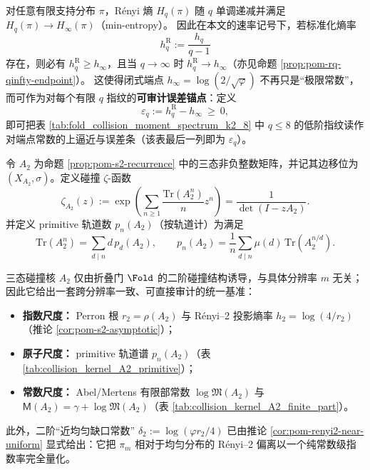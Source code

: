 \begin{remark}\label{rem:pom-renyi-gap-to-hinfty}
对任意有限支持分布 \(\pi\)，Rényi 熵 \(H_q(\pi)\) 随 \(q\) 单调递减并满足 \(H_q(\pi)\to H_\infty(\pi)\)（min-entropy）。
因此在本文的速率记号下，若标准化熵率
\[
h_q^{\mathrm R}:=\frac{h_q}{q-1}
\]
存在，则必有 \(h_q^{\mathrm R}\ge h_\infty\)，且当 \(q\to\infty\) 时 \(h_q^{\mathrm R}\to h_\infty\)（亦见命题 \ref{prop:pom-rq-qinfty-endpoint}）。
这使得闭式端点 \(h_\infty=\log(2/\sqrt{\varphi})\) 不再只是“极限常数”，而可作为对每个有限 \(q\) 指纹的\textbf{可审计误差锚点}：定义
\[
\varepsilon_q:=h_q^{\mathrm R}-h_\infty\ \ge\ 0,
\]
即可把表 \ref{tab:fold_collision_moment_spectrum_k2_8} 中 \(q\le 8\) 的低阶指纹读作对端点常数的上逼近与误差条（该表最后一列即为 \(\varepsilon_q\)）。
\end{remark}

\begin{definition}\label{def:pom-collision-zeta}
令 \(A_2\) 为命题 \ref{prop:pom-s2-recurrence} 中的三态非负整数矩阵，并记其边移位为 \((X_{A_2},\sigma)\)。定义碰撞 \(\zeta\)-函数
$$
\zeta_{A_2}(z):=\exp\!\left(\sum_{n\ge 1}\frac{\mathrm{Tr}(A_2^n)}{n}z^n\right)
=\frac{1}{\det(I-zA_2)}.
$$
并定义 primitive 轨道数 \(p_n(A_2)\)（按轨道计）为满足
$$
\mathrm{Tr}(A_2^n)=\sum_{d\mid n} d\,p_d(A_2),
\qquad
p_n(A_2)=\frac{1}{n}\sum_{d\mid n}\mu(d)\,\mathrm{Tr}(A_2^{n/d}).
$$
\end{definition}




\begin{corollary}\label{cor:pom-a2-benchmark}
三态碰撞核 \(A_2\) 仅由折叠门 \(\Fold\) 的二阶碰撞结构诱导，与具体分辨率 \(m\) 无关；因此它给出一套跨分辨率一致、可直接审计的统一基准：
\begin{itemize}
  \item \textbf{指数尺度：} Perron 根 \(r_2=\rho(A_2)\) 与 Rényi--2 投影熵率 \(h_2=\log(4/r_2)\)（推论 \ref{cor:pom-s2-asymptotic}）；
  \item \textbf{原子尺度：} primitive 轨道谱 \(p_n(A_2)\)（表 \ref{tab:collision_kernel_A2_primitive}）；
  \item \textbf{常数尺度：} Abel/Mertens 有限部常数 \(\log\mathfrak{M}(A_2)\) 与 \(\mathsf{M}(A_2)=\gamma+\log\mathfrak{M}(A_2)\)（表 \ref{tab:collision_kernel_A2_finite_part}）。
\end{itemize}
此外，二阶“近均匀缺口常数”
\(
\delta_2:=\log(\varphi r_2/4)
\)
已由推论 \ref{cor:pom-renyi2-near-uniform} 显式给出：它把 \(\pi_m\) 相对于均匀分布的 Rényi--2 偏离以一个纯常数级指数率完全量化。
\end{corollary}

